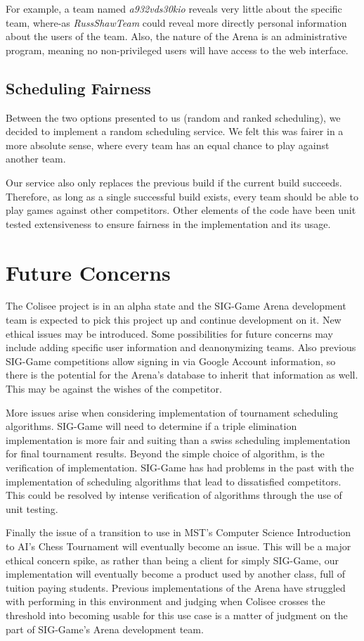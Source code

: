 \documentclass{article}
\begin{document}
For example, a team named \textit{a932vds30kio} reveals very little about the specific team, where-as \textit{RussShawTeam} could reveal more directly personal information about the users of the team. Also, the nature of the Arena is an administrative program, meaning no non-privileged users will have access to the web interface.

\subsection{Scheduling Fairness}
Between the two options presented to us (random and ranked scheduling), we decided to implement a random scheduling service. We felt this was fairer in a more absolute sense, where every team has an equal chance to play against another team.

Our service also only replaces the previous build if the current build succeeds. Therefore, as long as a single successful build exists, every team should be able to play games against other competitors. Other elements of the code have been unit tested extensiveness to ensure fairness in the implementation and its usage.

\newpage
\section{Future Concerns}
The Colisee project is in an alpha state and the SIG-Game Arena development team is expected to pick this project up and continue development on it. New ethical issues may be introduced. Some possibilities for future concerns may include adding specific user information and deanonymizing teams. Also previous SIG-Game competitions allow signing in via Google Account information, so there is the potential for the Arena's database to inherit that information as well. This may be against the wishes of the competitor. 

More issues arise when considering implementation of tournament scheduling algorithms. SIG-Game will need to determine if a triple elimination implementation is more fair and suiting than a swiss scheduling implementation for final tournament results. Beyond the simple choice of algorithm, is the verification of implementation. SIG-Game has had problems in the past with the implementation of scheduling algorithms that lead to dissatisfied competitors. This could be resolved by intense verification of algorithms through the use of unit testing. 

Finally the issue of a transition to use in MST's Computer Science Introduction to AI's Chess Tournament will eventually become an issue. This will be a major ethical concern spike, as rather than being a client for simply SIG-Game, our implementation will eventually become a product used by another class, full of tuition paying students. Previous implementations of the Arena have struggled with performing in this environment  and judging when Colisee crosses the threshold into becoming usable for this use case is a matter of judgment on the part of SIG-Game's Arena development team.
\end{document}
